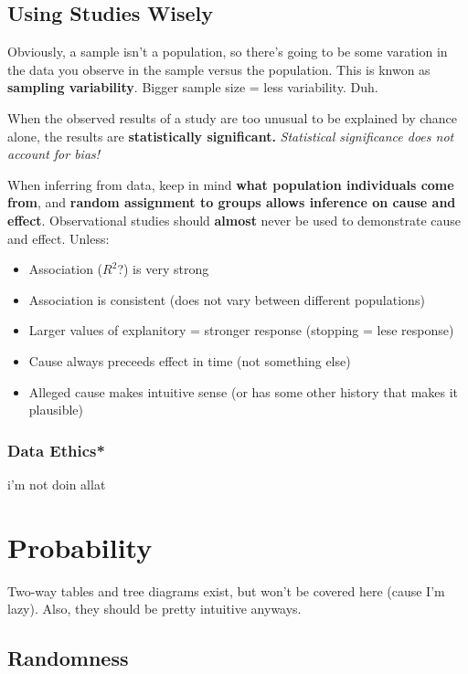 \documentclass[12pt, a4paper]{article}
\theoremstyle{definition}
\begin{document}
\subsection{Using Studies Wisely}

Obviously, a sample isn't a population, so there's going to be some varation in the data you observe in the sample versus the population.
This is knwon as \textbf{sampling variability}.
Bigger sample size = less variability. Duh.

When the observed results of a study are too unusual to be explained by chance alone, the results are \textbf{statistically significant.}
\textit{Statistical significance does not account for bias!}

When inferring from data, keep in mind \textbf{what population individuals come from}, and \textbf{random assignment to groups allows inference on cause and effect}.
Observational studies should \textbf{almost} never be used to demonstrate cause and effect. Unless:
\begin{itemize}
    \item Association ($R^2$?) is very strong
    \item Association is consistent (does not vary between different populations)
    \item Larger values of explanitory = stronger response (stopping = lese response)
    \item Cause always preceeds effect in time (not something else)
    \item Alleged cause makes intuitive sense (or has some other history that makes it plausible)
\end{itemize}

\subsubsection{Data Ethics*}
i'm not doin allat

\newpage

\section{Probability}

Two-way tables and tree diagrams exist, but won't be covered here (cause I'm lazy).
Also, they should be pretty intuitive anyways.

\subsection{Randomness}
\end{document}
